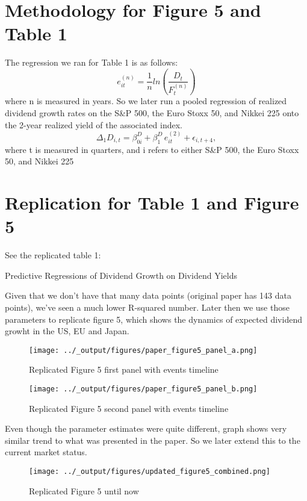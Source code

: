 \documentclass{article}
\begin{document}
\section{Methodology for Figure 5 and Table 1}
The regression we ran for Table 1 is as follows: 
\[
e_{it}^{(n)} = \frac{1}{n}ln(\frac{D_t}{F_t^{(n)}})
\]
where n is measured in years. So we later run a pooled regression of realized dividend growth rates on the S\&P 500, 
the Euro Stoxx 50, and Nikkei 225 onto the 2-year realized yield of the associated index. 
\[
\Delta_1 D_{i,t} 
= \beta_{0i}^D 
+ \beta_{1}^D \, e_{it}^{(2)} 
+ \epsilon_{i,t+4},
\]
where t is measured in quarters, and i refers to either S\&P 500, 
the Euro Stoxx 50, and Nikkei 225
\section{Replication for Table 1 and Figure 5}
See the replicated table 1:
\begin{table}[H]
  \centering
  \caption{Predictive Regressions of Dividend Growth on Dividend Yields}
  
  \label{tab:your_label}
  \end{table}

Given that we don't have that many data points (original paper has 143 data points), 
we've seen a much lower R-squared number. 
Later then we use those parameters to replicate figure 5, which shows the dynamics of expected dividend growht in the US, EU and Japan.
 
\begin{figure}[H]
  \centering
  \texttt{[image: ../\_output/figures/paper\_figure5\_panel\_a.png]} 
  \caption{Replicated Figure 5 first panel with events timeline}
  \label{fig:figure_5 panel a}
\end{figure}

\begin{figure}[H]
  \centering
  \texttt{[image: ../\_output/figures/paper\_figure5\_panel\_b.png]} 
  \caption{Replicated Figure 5 second panel with events timeline}
  \label{fig:figure_5 panel b}
\end{figure}
Even though the parameter estimates were quite different, graph shows very similar trend to what was presented in the paper.
So we later extend this to the current market status.

\begin{figure}[H]
  \centering
  \texttt{[image: ../\_output/figures/updated\_figure5\_combined.png]}
  \caption{Replicated Figure 5 until now}
  \label{fig:figure_5_current}
\end{figure}
\end{document}
